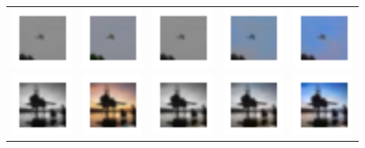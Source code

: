 \documentclass{article}
\begin{document}
\begin{table}[h!]
\begin{tabular}{ccccc}
    \includegraphics[width=2cm]{results3/97-bw.png} & \includegraphics[width=2cm]{results3/97-gt.png} & \includegraphics[width=2cm]{results5/97-relucnn.png} & \includegraphics[width=2cm]{results5/97-tanhcnn.png} & \includegraphics[width=2cm]{results3/97-gan.png} \\
    \includegraphics[width=2cm]{results3/192-bw.png} & \includegraphics[width=2cm]{results3/192-gt.png} & \includegraphics[width=2cm]{results5/192-relucnn.png} & \includegraphics[width=2cm]{results5/192-tanhcnn.png} & \includegraphics[width=2cm]{results3/192-gan.png} \\
    \bottomrule
  \end{tabular}
\end{table}
\end{document}

